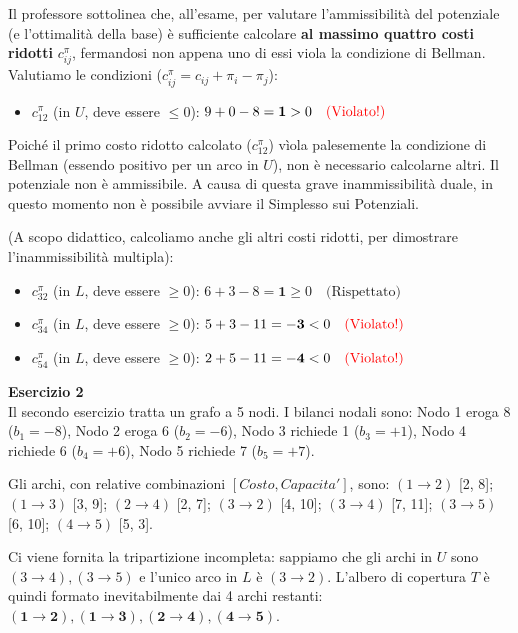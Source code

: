 \documentclass[12pt, a4paper]{article}
\newcommand{\separatore}{\noindent{\color{titlecolor!50}\rule{\textwidth}{0.6pt}}}
\begin{document}
	Il professore sottolinea che, all'esame, per valutare l'ammissibilità del potenziale (e l'ottimalità della base) è sufficiente calcolare \textbf{al massimo quattro costi ridotti} $c_{ij}^\pi$, fermandosi non appena uno di essi viola la condizione di Bellman. 
	Valutiamo le condizioni ($c_{ij}^\pi = c_{ij} + \pi_i - \pi_j$):
	\begin{itemize}
		\item $c_{12}^\pi$ (in $U$, deve essere $\le 0$): $9 + 0 - 8 = \mathbf{1} > 0 \quad \text{\textcolor{red}{(Violato!)}}$
	\end{itemize}
	Poiché il primo costo ridotto calcolato ($c_{12}^\pi$) vìola palesemente la condizione di Bellman (essendo positivo per un arco in $U$), non è necessario calcolarne altri. Il potenziale non è ammissibile. A causa di questa grave inammissibilità duale, in questo momento non è possibile avviare il Simplesso sui Potenziali.
	
	(A scopo didattico, calcoliamo anche gli altri costi ridotti, per dimostrare l'inammissibilità multipla):
	\begin{itemize}
		\item $c_{32}^\pi$ (in $L$, deve essere $\ge 0$): $6 + 3 - 8 = \mathbf{1} \ge 0 \quad \text{(Rispettato)}$
		\item $c_{34}^\pi$ (in $L$, deve essere $\ge 0$): $5 + 3 - 11 = \mathbf{-3} < 0 \quad \text{\textcolor{red}{(Violato!)}}$
		\item $c_{54}^\pi$ (in $L$, deve essere $\ge 0$): $2 + 5 - 11 = \mathbf{-4} < 0 \quad \text{\textcolor{red}{(Violato!)}}$
	\end{itemize}
	
	\vspace{0.6cm}
	\separatore
	\vspace{0.4cm}
	\textbf{Esercizio 2}\\
	Il secondo esercizio tratta un grafo a 5 nodi.
	I bilanci nodali sono: Nodo 1 eroga 8 ($b_1 = -8$), Nodo 2 eroga 6 ($b_2 = -6$), Nodo 3 richiede 1 ($b_3 = +1$), Nodo 4 richiede 6 ($b_4 = +6$), Nodo 5 richiede 7 ($b_5 = +7$).
	
	Gli archi, con relative combinazioni $[Costo, Capacita']$, sono:
	$(1\to2)$ [2, 8]; $(1\to3)$ [3, 9]; $(2\to4)$ [2, 7]; $(3\to2)$ [4, 10]; $(3\to4)$ [7, 11]; $(3\to5)$ [6, 10]; $(4\to5)$ [5, 3].
	
	Ci viene fornita la tripartizione incompleta: sappiamo che gli archi in $U$ sono $(3\to4), (3\to5)$ e l'unico arco in $L$ è $(3\to2)$. 
	L'albero di copertura $T$ è quindi formato inevitabilmente dai 4 archi restanti: $\mathbf{(1\to2), (1\to3), (2\to4), (4\to5)}$.
	
\end{document}
